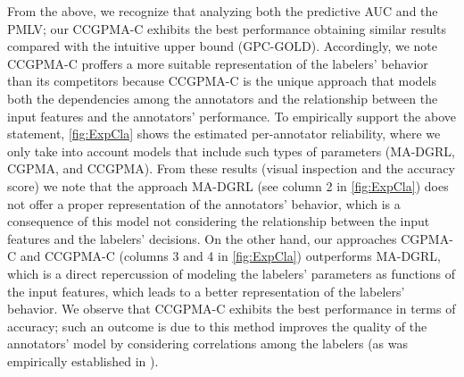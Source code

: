 \documentclass[journal]{IEEEtran}
\begin{document}
From the above, we recognize that analyzing both the predictive AUC and the PMLV; our CCGPMA-C exhibits the best performance obtaining similar results compared with the intuitive upper bound (GPC-GOLD). Accordingly, we note CCGPMA-C proffers a more suitable representation of the labelers' behavior than its competitors because CCGPMA-C is the unique approach that models both the dependencies among the annotators and the relationship between the input features and the annotators' performance. To empirically support the above statement, \cref{fig:ExpCla} shows the estimated per-annotator reliability, where we only take into account models that include such types of parameters (MA-DGRL, CGPMA, and CCGPMA). From these results (visual inspection and the accuracy score) we note that the approach MA-DGRL (see column 2 in \cref{fig:ExpCla}) does not offer a proper representation of the annotators' behavior, which is a consequence of this model not considering the relationship between the input features and the labelers' decisions. On the other hand, our approaches CGPMA-C and CCGPMA-C (columns 3 and 4 in \cref{fig:ExpCla}) outperforms MA-DGRL, which is a direct repercussion of modeling the labelers' parameters as functions of the input features, which leads to a better representation of the labelers' behavior. We observe that CCGPMA-C exhibits the best performance in terms of accuracy; such an outcome is due to this method improves the quality of the annotators' model by considering correlations among the labelers (as was empirically established in \cite{zhu2019unsupervised,gil2018learning}).
\end{document}
